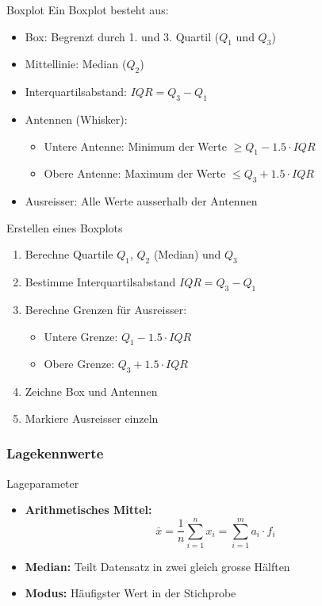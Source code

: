 \begin{definition}{Boxplot}
Ein Boxplot besteht aus:
\begin{itemize}
    \item Box: Begrenzt durch 1. und 3. Quartil ($Q_1$ und $Q_3$)
    \item Mittellinie: Median ($Q_2$)
    \item Interquartilsabstand: $IQR = Q_3 - Q_1$
    \item Antennen (Whisker):
    \begin{itemize}
        \item Untere Antenne: Minimum der Werte $\geq Q_1 - 1.5 \cdot IQR$
        \item Obere Antenne: Maximum der Werte $\leq Q_3 + 1.5 \cdot IQR$
    \end{itemize}
    \item Ausreisser: Alle Werte ausserhalb der Antennen
\end{itemize}
\end{definition}

\begin{KR}{Erstellen eines Boxplots}
\begin{enumerate}
    \item Berechne Quartile $Q_1$, $Q_2$ (Median) und $Q_3$
    \item Bestimme Interquartilsabstand $IQR = Q_3 - Q_1$
    \item Berechne Grenzen für Ausreisser:
    \begin{itemize}
        \item Untere Grenze: $Q_1 - 1.5 \cdot IQR$
        \item Obere Grenze: $Q_3 + 1.5 \cdot IQR$
    \end{itemize}
    \item Zeichne Box und Antennen
    \item Markiere Ausreisser einzeln
\end{enumerate}
\end{KR}

\subsubsection{Lagekennwerte}

\begin{definition}{Lageparameter}
\begin{itemize}
    \item \textbf{Arithmetisches Mittel:}
    $$\bar{x} = \frac{1}{n}\sum_{i=1}^n x_i = \sum_{i=1}^m a_i \cdot f_i$$
    
    \item \textbf{Median:} Teilt Datensatz in zwei gleich grosse Hälften
    
    \item \textbf{Modus:} Häufigster Wert in der Stichprobe
\end{itemize}
\end{definition}

